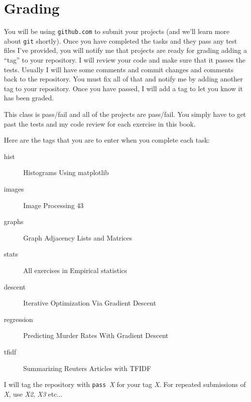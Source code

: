 \chapter{Grading}

You will be using {\tt github.com} to submit your projects (and we'll learn more about {\tt git} shortly).  Once you have completed the tasks and they pass any test files I've provided, you will notify me that projects are ready for grading adding a ``tag'' to your repository.  I will review your code and make sure that it passes the tests. Usually I will have some comments and commit changes and comments back to the repository. You must fix all of that and notify me by adding another tag to your repository. Once you have passed, I will add a tag to let you know it has been graded.

This class is pass/fail and all of the projects are pass/fail. You simply have to get past the tests and my code review for each exercise in this book.

Here are the tags that you are to enter when you complete each task:

\begin{description}
\item[hist] Histograms Using matplotlib
\item[images] Image Processing 43
\item[graphs] Graph Adjacency Lists and Matrices
\item[stats] All exercises in Empirical statistics
\item[descent] Iterative Optimization Via Gradient Descent
\item[regression] Predicting Murder Rates With Gradient Descent
\item[tfidf] Summarizing Reuters Articles with TFIDF
\end{description}

I will tag the repository with {\tt pass }{\em X} for your tag {\em X}. For repeated submissions of {\em X}, use {\em X2}, {\em X3} etc...